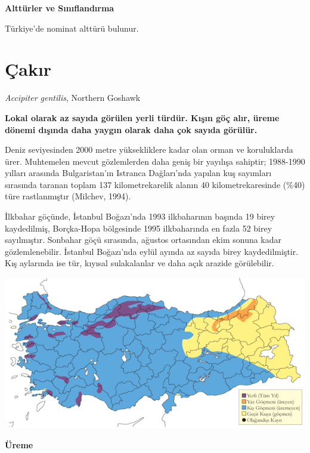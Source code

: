\documentclass[
  a4paper,
  DIV=11,
  numbers=noendperiod]{scrreprt}
\begin{document}
\textbf{Alttürler ve Sınıflandırma}

Türkiye'de nominat alttürü bulunur.

\section{Çakır}\label{uxe7akux131r}

\emph{Accipiter gentilis}, Northern Goshawk

\textbf{Lokal olarak az sayıda görülen yerli türdür. Kışın göç alır,
üreme dönemi dışında daha yaygın olarak daha çok sayıda görülür.}

Deniz seviyesinden 2000 metre yüksekliklere kadar olan orman ve
koruluklarda ürer. Muhtemelen mevcut gözlemlerden daha geniş bir
yayılışa sahiptir; 1988-1990 yılları arasında Bulgaristan'ın Istranca
Dağları'nda yapılan kuş sayımları sırasında taranan toplam 137
kilometrekarelik alanın 40 kilometrekaresinde (\%40) türe rastlanmıştır
(Milchev, 1994).

İlkbahar göçünde, İstanbul Boğazı'nda 1993 ilkbaharının başında 19 birey
kaydedilmiş, Borçka-Hopa bölgesinde 1995 ilkbaharında en fazla 52 birey
sayılmıştır. Sonbahar göçü sırasında, ağustos ortasından ekim sonuna
kadar gözlemlenebilir. İstanbul Boğazı'nda eylül ayında az sayıda birey
kaydedilmiştir. Kış aylarında ise tür, kıyısal sulakalanlar ve daha açık
arazide görülebilir.

\includegraphics{images/harita_Page_101.png}

\textbf{Üreme}
\end{document}

